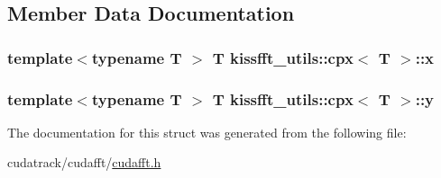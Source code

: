 \subsection{Member Data Documentation}
\subsubsection[{\texorpdfstring{x}{x}}]{\setlength{\rightskip}{0pt plus 5cm}template$<$typename T $>$ T {\bf kissfft\+\_\+utils\+::cpx}$<$ T $>$\+::x}\hypertarget{structkissfft__utils_1_1cpx_a903802603574fd9cb20b1c90b4799b6b}{}\label{structkissfft__utils_1_1cpx_a903802603574fd9cb20b1c90b4799b6b}
\subsubsection[{\texorpdfstring{y}{y}}]{\setlength{\rightskip}{0pt plus 5cm}template$<$typename T $>$ T {\bf kissfft\+\_\+utils\+::cpx}$<$ T $>$\+::y}\hypertarget{structkissfft__utils_1_1cpx_a443bacf3cf5eb9a4a54f2c2448b03124}{}\label{structkissfft__utils_1_1cpx_a443bacf3cf5eb9a4a54f2c2448b03124}


The documentation for this struct was generated from the following file\+:\begin{DoxyCompactItemize}
\item 
cudatrack/cudafft/\hyperlink{cudafft_8h}{cudafft.\+h}\end{DoxyCompactItemize}
